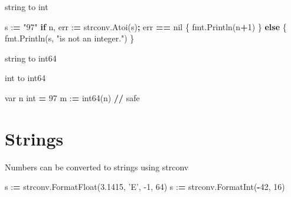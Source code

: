 \documentclass[]{book}
\newenvironment{Shaded}{\begin{snugshade}}{\end{snugshade}}
\newcommand{\BuiltInTok}[1]{#1}
\newcommand{\ControlFlowTok}[1]{\textcolor[rgb]{0.13,0.29,0.53}{\textbf{#1}}}
\newcommand{\DecValTok}[1]{\textcolor[rgb]{0.00,0.00,0.81}{#1}}
\newcommand{\FloatTok}[1]{\textcolor[rgb]{0.00,0.00,0.81}{#1}}
\newcommand{\NormalTok}[1]{#1}
\newcommand{\OperatorTok}[1]{\textcolor[rgb]{0.81,0.36,0.00}{\textbf{#1}}}
\newcommand{\SpecialCharTok}[1]{\textcolor[rgb]{0.00,0.00,0.00}{#1}}
\newcommand{\StringTok}[1]{\textcolor[rgb]{0.31,0.60,0.02}{#1}}
\begin{document}
string to int

\begin{Shaded}
\begin{Highlighting}[]
\NormalTok{s :}\OperatorTok{=} \StringTok{"97"}
\ControlFlowTok{if}\NormalTok{ n, err :}\OperatorTok{=}\NormalTok{ strconv.Atoi(s)}\OperatorTok{;}\NormalTok{ err }\OperatorTok{==}\NormalTok{ nil \{}
\NormalTok{    fmt.Println(n}\OperatorTok{+}\DecValTok{1}\NormalTok{)}
\NormalTok{\} }\ControlFlowTok{else}\NormalTok{ \{}
\NormalTok{    fmt.Println(s, }\StringTok{"is not an integer."}\NormalTok{)}
\NormalTok{\}}
\end{Highlighting}
\end{Shaded}

string to int64

\begin{Shaded}
\end{Shaded}

int to int64

\begin{Shaded}
\begin{Highlighting}[]
\NormalTok{var n }\BuiltInTok{int} \OperatorTok{=} \DecValTok{97}
\NormalTok{m :}\OperatorTok{=}\NormalTok{ int64(n) }\OperatorTok{//}\NormalTok{ safe}
\end{Highlighting}
\end{Shaded}

\hypertarget{strings}{%
\section{Strings}\label{strings}}

Numbers can be converted to strings using strconv

\begin{Shaded}
\begin{Highlighting}[]
\NormalTok{s :}\OperatorTok{=}\NormalTok{ strconv.FormatFloat(}\FloatTok{3.1415}\NormalTok{, }\StringTok{'E'}\NormalTok{, }\DecValTok{-1}\NormalTok{, }\DecValTok{64}\NormalTok{)}
\NormalTok{s :}\OperatorTok{=}\NormalTok{ strconv.FormatInt(}\OperatorTok{-}\DecValTok{42}\NormalTok{, }\DecValTok{16}\NormalTok{)}
\end{Highlighting}
\end{Shaded}
\end{document}
